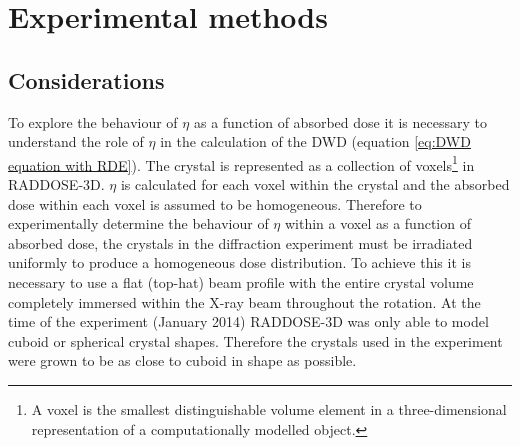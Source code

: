 \section{Experimental methods}
\label{sec:Experimental Methods}

\subsection{Considerations}
\label{sub:Considerations}
To explore the behaviour of $\eta$ as a function of absorbed dose it is necessary to understand the role of $\eta$ in the calculation of the DWD (equation \ref{eq:DWD equation with RDE}).
The crystal is represented as a collection of voxels\footnote{A voxel is the smallest distinguishable volume element in a three-dimensional representation of a computationally modelled object.} in RADDOSE-3D.
$\eta$ is calculated for each voxel within the crystal and the absorbed dose within each voxel is assumed to be homogeneous.
Therefore to experimentally determine the behaviour of $\eta$ within a voxel as a function of absorbed dose, the crystals in the diffraction experiment must be irradiated uniformly to produce a homogeneous dose distribution.
To achieve this it is necessary to use a flat (top-hat) beam profile with the entire crystal volume completely immersed within the X-ray beam throughout the rotation.
At the time of the experiment (January 2014) RADDOSE-3D was only able to model cuboid or spherical crystal shapes.
Therefore the crystals used in the experiment were grown to be as close to cuboid in shape as possible.

